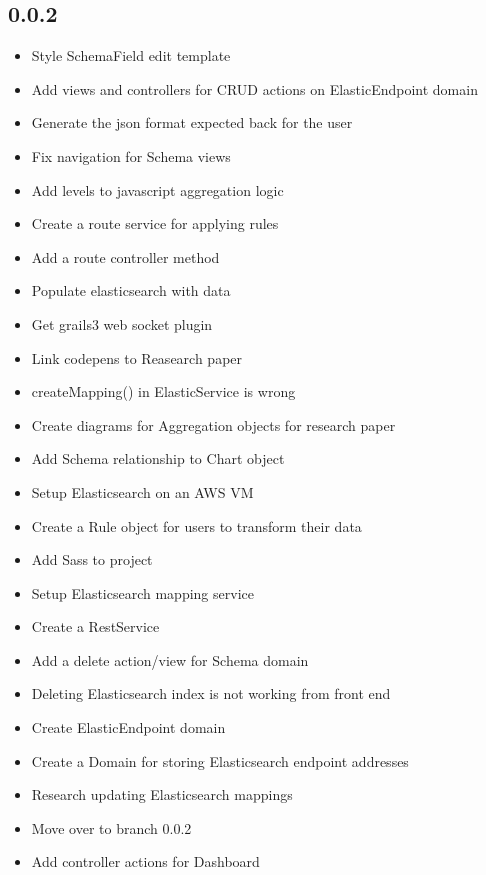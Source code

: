 \documentclass[12pt]{report}
\begin{document}
\subsection{0.0.2}
\begin{itemize}
\item Style SchemaField edit template
\item Add views and controllers for CRUD actions on ElasticEndpoint domain
\item Generate the json format expected back for the user
\item Fix navigation for Schema views
\item Add levels to javascript aggregation logic
\item Create a route service for applying rules
\item Add a route controller method
\item Populate elasticsearch with data
\item Get grails3 web socket plugin
\item Link codepens to Reasearch paper
\item createMapping() in ElasticService is wrong
\item Create diagrams for Aggregation objects for research paper
\item Add Schema relationship to Chart object
\item Setup Elasticsearch on an AWS VM
\item Create a Rule object for users to transform their data
\item Add Sass to project
\item Setup Elasticsearch mapping service
\item Create a RestService
\item Add a delete action/view for Schema domain
\item Deleting Elasticsearch index is not working from front end
\item Create ElasticEndpoint domain
\item Create a Domain for storing Elasticsearch endpoint addresses
\item Research updating Elasticsearch mappings
\item Move over to branch 0.0.2
\item Add controller actions for Dashboard
\end{itemize}
\end{document}
